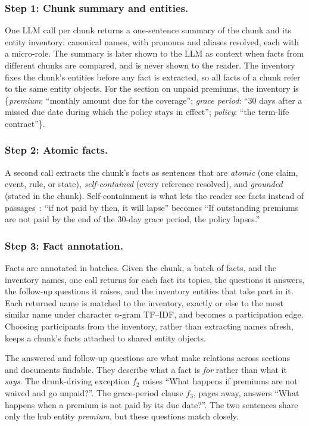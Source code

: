 \documentclass[sigconf, review, anonymous]{acmart}
\begin{document}
\subsubsection*{Step 1: Chunk summary and entities.}
One LLM call per chunk returns a one-sentence summary of the chunk and its entity inventory: canonical names, with pronouns and aliases resolved, each with a micro-role. The summary is later shown to the LLM as context when facts from different chunks are compared, and is never shown to the reader. The inventory fixes the chunk's entities before any fact is extracted, so all facts of a chunk refer to the same entity objects. For the section on unpaid premiums, the inventory is \{\emph{premium}: ``monthly amount due for the coverage''; \emph{grace period}: ``30 days after a missed due date during which the policy stays in effect''; \emph{policy}: ``the term-life contract''\}.

\subsubsection*{Step 2: Atomic facts.}
A second call extracts the chunk's facts as sentences that are \emph{atomic} (one claim, event, rule, or state), \emph{self-contained} (every reference resolved), and \emph{grounded} (stated in the chunk). Self-containment is what lets the reader see facts instead of passages~\cite{chen2024dense,min2023factscore}: ``if not paid by then, it will lapse'' becomes ``If outstanding premiums are not paid by the end of the 30-day grace period, the policy lapses.''

\subsubsection*{Step 3: Fact annotation.}
Facts are annotated in batches. Given the chunk, a batch of facts, and the inventory names, one call returns for each fact its topics, the questions it answers, the follow-up questions it raises, and the inventory entities that take part in it. Each returned name is matched to the inventory, exactly or else to the most similar name under character $n$-gram TF--IDF, and becomes a participation edge. Choosing participants from the inventory, rather than extracting names afresh, keeps a chunk's facts attached to shared entity objects.

The answered and follow-up questions are what make relations across sections and documents findable. They describe what a fact is \emph{for} rather than what it \emph{says}. The drunk-driving exception $f_2$ raises ``What happens if premiums are not waived and go unpaid?''. The grace-period clause $f_3$, pages away, answers ``What happens when a premium is not paid by its due date?''. The two sentences share only the hub entity \emph{premium}, but these questions match closely.
\end{document}
